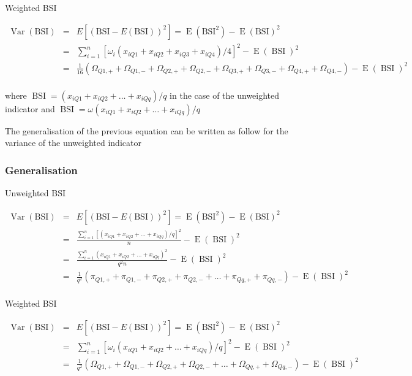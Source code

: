 \documentclass[12pt,a4paper,oneside]{book}
\DeclareMathOperator{\Var}{Var}
\DeclareMathOperator{\E}{E}
\DeclareMathOperator{\BSI}{BSI}
\begin{document}
Weighted BSI

\begin{eqnarray}
         \Var(\text{BSI}) &=& E \left[ \left(\text{BSI}-E(\text{BSI}) \right)^2 \right] =  \E \left( \text{BSI}^2\right) - \E \left( \text{BSI}\right)^2 \\ 
         &=&  \sum^n_{i=1} \left[\omega_i (x_{iQ1} + x_{iQ2} + x_{iQ3} + x_{iQ4})/4 \right]^2 - \E (\BSI)^2 \\
         &=& \frac{1}{16} \left( \Omega_{Q1,+} + \Omega_{Q1,-} + \Omega_{Q2,+} + \Omega_{Q2,-} + \Omega_{Q3,+} + \Omega_{Q3,-} + \Omega_{Q4,+} + \Omega_{Q4,-} \right) - \E (\BSI)^2 \nonumber \\ 
\end{eqnarray}

where $\BSI = \left(x_{i Q1} + x_{i Q2} + \ldots + x_{i Qq} \right) / q $ in the case of the unweighted indicator and $\BSI = \omega \left(x_{i Q1} + x_{i Q2} + \ldots + x_{i Qq} \right) / q $


The generalisation of the previous equation can be written as follow for the variance of the unweighted indicator

\newpage
\subsubsection{Generalisation}

Unweighted BSI

\begin{eqnarray}
         \Var(\text{BSI}) &=& E \left[ \left(\text{BSI}-E(\text{BSI}) \right)^2 \right] =  \E \left( \text{BSI}^2\right) - \E \left( \text{BSI}\right)^2 \\ 
         &=&  \frac{\sum^n_{i=1}[(x_{iQ1} + x_{iQ2} + \ldots + x_{iQq})/q]^2}{n} - \E (\BSI)^2 \\
        &=&  \frac{\sum^n_{i=1}(x_{iQ1} + x_{iQ2} + \ldots + x_{iQq})^2}{q^2 n} - \E (\BSI)^2 \\
        &=& \frac{1}{q^2} \left( \pi_{Q1,+} + \pi_{Q1,-} + \pi_{Q2,+} + \pi_{Q2,-} + \ldots + \pi_{Qq,+} + \pi_{Qq,-} \right) - \E (\BSI)^2 \nonumber \\ 
\end{eqnarray}

Weighted BSI

\begin{eqnarray}
         \Var(\text{BSI}) &=& E \left[ \left(\text{BSI}-E(\text{BSI}) \right)^2 \right] =  \E \left( \text{BSI}^2\right) - \E \left( \text{BSI}\right)^2 \\ 
         &=&  \sum^n_{i=1} \left[\omega_i (x_{iQ1} + x_{iQ2} + \ldots + x_{iQq})/q \right]^2 - \E (\BSI)^2 \\
         &=& \frac{1}{q^2} \left( \Omega_{Q1,+} + \Omega_{Q1,-} + \Omega_{Q2,+} + \Omega_{Q2,-} + \ldots + \Omega_{Qq,+} + \Omega_{Qq,-} \right) - \E (\BSI)^2 \nonumber \\ 
\end{eqnarray}
\end{document}

